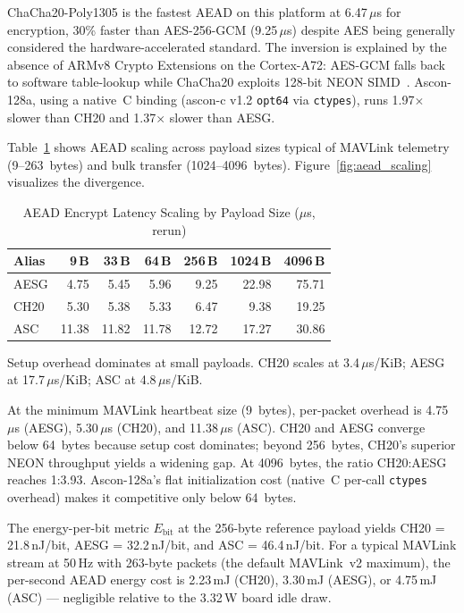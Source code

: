 ChaCha20-Poly1305 is the fastest AEAD on this platform at 6.47\,$\mu$s
for encryption, 30\% faster than AES-256-GCM (9.25\,$\mu$s) despite AES
being generally considered the hardware-accelerated standard.  The
inversion is explained by the absence of ARMv8 Crypto Extensions on the
Cortex-A72: AES-GCM falls back to software table-lookup while
ChaCha20 exploits 128-bit NEON SIMD~\cite{rfc8439}.  Ascon-128a, using
a native~C binding (ascon-c v1.2 \texttt{opt64} via \texttt{ctypes}),
runs 1.97$\times$ slower than CH20 and 1.37$\times$ slower than AESG.

Table~\ref{tab:aead_scaling} shows AEAD scaling across payload sizes
typical of MAVLink telemetry (9--263~bytes) and bulk transfer (1024--4096~bytes).
Figure~\ref{fig:aead_scaling} visualizes the divergence.

\begin{table}[t]
\centering
\caption{AEAD Encrypt Latency Scaling by Payload Size ($\mu$s, rerun)}
\label{tab:aead_scaling}
\footnotesize
\begin{tabular}{@{}lrrrrrr@{}}
\toprule
\textbf{Alias} &
  \textbf{9\,B} & \textbf{33\,B} & \textbf{64\,B} &
  \textbf{256\,B} & \textbf{1024\,B} & \textbf{4096\,B} \\
\midrule
AESG & 4.75  & 5.45  & 5.96  & 9.25  & 22.98 & 75.71 \\
CH20 & 5.30  & 5.38  & 5.33  & 6.47  & 9.38  & 19.25 \\
ASC  & 11.38 & 11.82 & 11.78 & 12.72 & 17.27 & 30.86 \\
\bottomrule
\end{tabular}
\begin{tablenotes}
\footnotesize
\item Setup overhead dominates at small payloads.
  CH20 scales at 3.4\,$\mu$s/KiB; AESG at 17.7\,$\mu$s/KiB; ASC at 4.8\,$\mu$s/KiB.
\end{tablenotes}
\end{table}

At the minimum MAVLink heartbeat size (9~bytes), per-packet
overhead is 4.75\,$\mu$s (AESG), 5.30\,$\mu$s (CH20), and
11.38\,$\mu$s (ASC).  CH20 and AESG converge below 64~bytes because
setup cost dominates; beyond 256~bytes, CH20's superior NEON throughput
yields a widening gap.  At 4096~bytes, the ratio CH20:AESG reaches
1:3.93.  Ascon-128a's flat initialization cost (native~C per-call
\texttt{ctypes} overhead) makes it competitive only below 64~bytes.

The energy-per-bit metric $E_\text{bit}$ at the 256-byte reference
payload yields CH20 = 21.8\,nJ/bit, AESG = 32.2\,nJ/bit, and ASC =
46.4\,nJ/bit.  For a typical MAVLink stream at 50\,Hz with 263-byte
packets (the default MAVLink~v2 maximum), the per-second AEAD energy
cost is 2.23\,mJ (CH20), 3.30\,mJ (AESG), or 4.75\,mJ (ASC) —
negligible relative to the 3.32\,W board idle draw.

